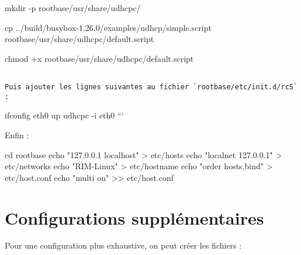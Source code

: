 \documentclass[]{article}
\newenvironment{Shaded}{}{}
\newcommand{\StringTok}[1]{\textcolor[rgb]{0.25,0.44,0.63}{{#1}}}
\newcommand{\OperatorTok}[1]{\textcolor[rgb]{0.40,0.40,0.40}{{#1}}}
\newcommand{\BuiltInTok}[1]{{#1}}
\newcommand{\NormalTok}[1]{{#1}}
\begin{document}
mkdir -p rootbase/usr/share/udhcpc/

cp ../build/busybox-1.26.0/examples/udhcp/simple.script
rootbase/usr/share/udhcpc/default.script

chmod +x rootbase/usr/share/udhcpc/default.script

\begin{verbatim}

Puis ajouter les lignes suivantes au fichier `rootbase/etc/init.d/rcS` :
\end{verbatim}

ifconfig eth0 up udhcpc -i eth0 ```

Enfin :

\begin{Shaded}
\begin{Highlighting}[]
\BuiltInTok{cd} \NormalTok{rootbase}
\BuiltInTok{echo} \StringTok{"127.0.0.1      localhost"} \OperatorTok{>} \NormalTok{etc/hosts}
\BuiltInTok{echo} \StringTok{"localnet    127.0.0.1"} \OperatorTok{>} \NormalTok{etc/networks}
\BuiltInTok{echo} \StringTok{"RIM-Linux"} \OperatorTok{>} \NormalTok{etc/hostname}
\BuiltInTok{echo} \StringTok{"order hosts,bind"} \OperatorTok{>} \NormalTok{etc/host.conf}
\BuiltInTok{echo} \StringTok{"multi on"} \OperatorTok{>>} \NormalTok{etc/host.conf}
\end{Highlighting}
\end{Shaded}

\section{Configurations
supplémentaires}\label{configurations-suppluxe9mentaires}

Pour une configuration plus exhaustive, on peut créer les fichiers :
\end{document}
